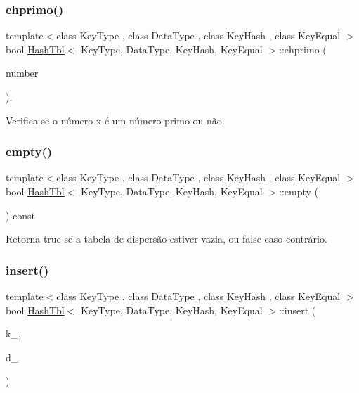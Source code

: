 \subsubsection{\texorpdfstring{ehprimo()}{ehprimo()}}
{\footnotesize\ttfamily template$<$class Key\+Type , class Data\+Type , class Key\+Hash , class Key\+Equal $>$ \\
bool \hyperlink{classHashTbl}{Hash\+Tbl}$<$ Key\+Type, Data\+Type, Key\+Hash, Key\+Equal $>$\+::ehprimo (\begin{DoxyParamCaption}\item[{size\+\_\+t}]{number }\end{DoxyParamCaption})\hspace{0.3cm}{\ttfamily [inline]}, {\ttfamily [private]}}



Verifica se o número x é um número primo ou não. 

\mbox{\label{classHashTbl_af0a640cbc448ffc7a874ec3ce2a28bd2}} 
\subsubsection{\texorpdfstring{empty()}{empty()}}
{\footnotesize\ttfamily template$<$class Key\+Type , class Data\+Type , class Key\+Hash , class Key\+Equal $>$ \\
bool \hyperlink{classHashTbl}{Hash\+Tbl}$<$ Key\+Type, Data\+Type, Key\+Hash, Key\+Equal $>$\+::empty (\begin{DoxyParamCaption}\item[{void}]{ }\end{DoxyParamCaption}) const\hspace{0.3cm}{\ttfamily [inline]}}



Retorna true se a tabela de dispersão estiver vazia, ou false caso contrário. 

\mbox{\label{classHashTbl_a5abe7dd52a783fbfa005bcfbb6fdea3e}} 
\subsubsection{\texorpdfstring{insert()}{insert()}}
{\footnotesize\ttfamily template$<$class Key\+Type , class Data\+Type , class Key\+Hash , class Key\+Equal $>$ \\
bool \hyperlink{classHashTbl}{Hash\+Tbl}$<$ Key\+Type, Data\+Type, Key\+Hash, Key\+Equal $>$\+::insert (\begin{DoxyParamCaption}\item[{const Key\+Type \&}]{k\+\_\+,  }\item[{const Data\+Type \&}]{d\+\_\+ }\end{DoxyParamCaption})\hspace{0.3cm}{\ttfamily [inline]}}

